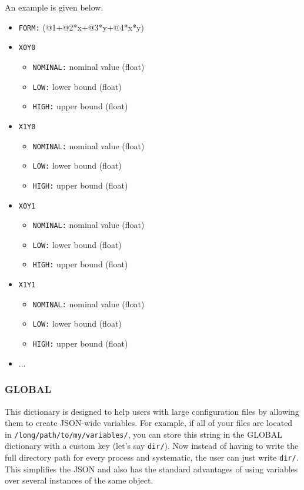 \documentclass[letter]{article}
\begin{document}
            An example is given below.
            \begin{itemize}
                \item \verb"FORM:" (@1+@2*x+@3*y+@4*x*y)
                \item \verb"X0Y0"
                \begin{itemize}
                    \item \verb"NOMINAL:" nominal value (float)
                    \item \verb"LOW:" lower bound (float)
                    \item \verb"HIGH:" upper bound (float)
                \end{itemize}
                \item \verb"X1Y0"
                \begin{itemize}
                    \item \verb"NOMINAL:" nominal value (float)
                    \item \verb"LOW:" lower bound (float)
                    \item \verb"HIGH:" upper bound (float)
                \end{itemize}
                \item \verb"X0Y1"
                \begin{itemize}
                    \item \verb"NOMINAL:" nominal value (float)
                    \item \verb"LOW:" lower bound (float)
                    \item \verb"HIGH:" upper bound (float)
                \end{itemize}
                \item \verb"X1Y1"
                \begin{itemize}
                    \item \verb"NOMINAL:" nominal value (float)
                    \item \verb"LOW:" lower bound (float)
                    \item \verb"HIGH:" upper bound (float)
                \end{itemize}
                \item ...
            \end{itemize}

        \subsubsection{GLOBAL}
        	This dictionary is designed to help users with large configuration files by allowing them to create JSON-wide variables. For example, if all of your files are located in \verb"/long/path/to/my/variables/", you can store this string in the GLOBAL dictionary with a custom key (let's say \verb"dir/"). Now instead of having to write the full directory path for every process and systematic, the user can just write \verb"dir/". This simplifies the JSON and also has the standard advantages of using variables over several instances of the same object.
\end{document}
